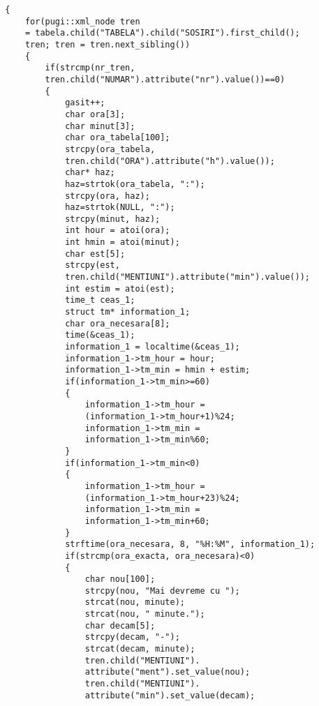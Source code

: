 \documentclass[runningheads]{llncs}
\begin{document}
\begin{verbatim}
        {
            for(pugi::xml_node tren 
            = tabela.child("TABELA").child("SOSIRI").first_child(); 
            tren; tren = tren.next_sibling())
            {
                if(strcmp(nr_tren, 
                tren.child("NUMAR").attribute("nr").value())==0)
                {
                    gasit++;
                    char ora[3];
                    char minut[3];
                    char ora_tabela[100];
                    strcpy(ora_tabela, 
                    tren.child("ORA").attribute("h").value());
                    char* haz;
                    haz=strtok(ora_tabela, ":");
                    strcpy(ora, haz);
                    haz=strtok(NULL, ":");
                    strcpy(minut, haz);
                    int hour = atoi(ora);
                    int hmin = atoi(minut);
                    char est[5];
                    strcpy(est, 
                    tren.child("MENTIUNI").attribute("min").value());
                    int estim = atoi(est);
                    time_t ceas_1;
                    struct tm* information_1;
                    char ora_necesara[8];
                    time(&ceas_1);
                    information_1 = localtime(&ceas_1);
                    information_1->tm_hour = hour;
                    information_1->tm_min = hmin + estim;
                    if(information_1->tm_min>=60)
                    {
                        information_1->tm_hour = 
                        (information_1->tm_hour+1)%24;
                        information_1->tm_min = 
                        information_1->tm_min%60;
                    }
                    if(information_1->tm_min<0)
                    {
                        information_1->tm_hour = 
                        (information_1->tm_hour+23)%24;
                        information_1->tm_min = 
                        information_1->tm_min+60;
                    }
                    strftime(ora_necesara, 8, "%H:%M", information_1);
                    if(strcmp(ora_exacta, ora_necesara)<0)
                    {
                        char nou[100];
                        strcpy(nou, "Mai devreme cu ");
                        strcat(nou, minute);
                        strcat(nou, " minute.");
                        char decam[5];
                        strcpy(decam, "-");
                        strcat(decam, minute);
                        tren.child("MENTIUNI").
                        attribute("ment").set_value(nou);
                        tren.child("MENTIUNI").
                        attribute("min").set_value(decam);

\end{verbatim}
\end{document}
